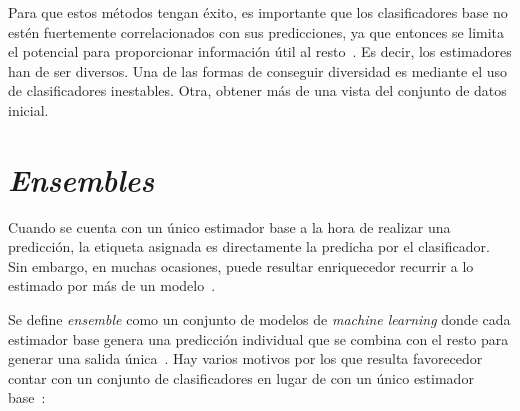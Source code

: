 Para que estos métodos tengan éxito, es importante que los clasificadores base no estén fuertemente correlacionados con sus predicciones, ya que entonces se limita el potencial para proporcionar información útil al resto~\cite{engelen2020surveyOnSemiSupervised}. Es decir, los estimadores han de ser diversos. Una de las formas de conseguir diversidad es mediante el uso de clasificadores inestables. Otra, obtener más de una vista del conjunto de datos inicial.


\section{\textit{Ensembles}}

Cuando se cuenta con un único estimador base a la hora de realizar una predicción, la etiqueta asignada es directamente la predicha por el clasificador. Sin embargo, en muchas ocasiones, puede resultar enriquecedor recurrir a lo estimado por más de un modelo~\cite{ensembles2006robi}. 

Se define \textit{ensemble} como un conjunto de modelos de \textit{machine learning} donde cada estimador base genera una predicción individual que se combina con el resto para generar una salida única~\cite{originalCoForest2007}.  Hay varios motivos por los que resulta favorecedor contar con un conjunto de clasificadores en lugar de con un único estimador base~\cite{ensembles2006robi}:

